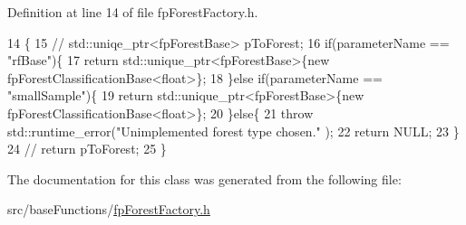 Definition at line 14 of file fp\+Forest\+Factory.\+h.


\begin{DoxyCode}
14                                                                                             \{
15             \textcolor{comment}{//  std::uniqe\_ptr<fpForestBase> pToForest;}
16                 \textcolor{keywordflow}{if}(parameterName == \textcolor{stringliteral}{"rfBase"})\{
17                     \textcolor{keywordflow}{return} std::unique\_ptr<fpForestBase>\{\textcolor{keyword}{new} fpForestClassificationBase<float>\};
18                 \}\textcolor{keywordflow}{else} \textcolor{keywordflow}{if}(parameterName == \textcolor{stringliteral}{"smallSample"})\{
19                     \textcolor{keywordflow}{return} std::unique\_ptr<fpForestBase>\{\textcolor{keyword}{new} fpForestClassificationBase<float>\};
20                 \}\textcolor{keywordflow}{else}\{
21                     \textcolor{keywordflow}{throw} std::runtime\_error(\textcolor{stringliteral}{"Unimplemented forest type chosen."} );
22                     \textcolor{keywordflow}{return} NULL;
23                 \}
24         \textcolor{comment}{//      return pToForest;}
25             \}
\end{DoxyCode}


The documentation for this class was generated from the following file\+:\begin{DoxyCompactItemize}
\item 
src/base\+Functions/\hyperlink{fpForestFactory_8h}{fp\+Forest\+Factory.\+h}\end{DoxyCompactItemize}
